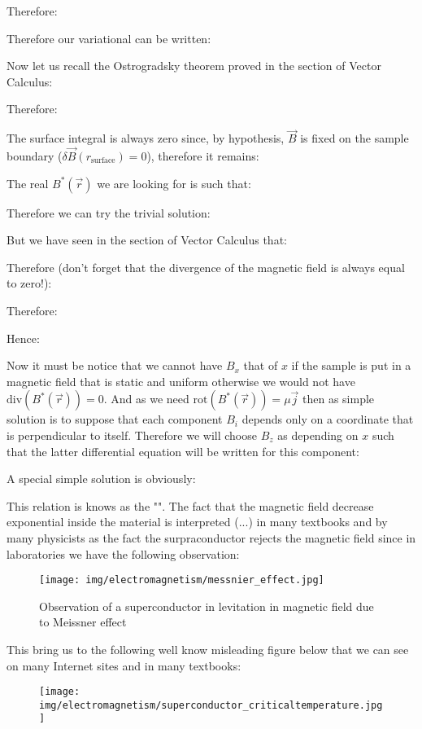 	Therefore:
	
	Therefore our variational can be written:
	
	Now let us recall the Ostrogradsky theorem proved in the section of Vector Calculus:
	
	Therefore:
	
	The surface integral is always zero since, by hypothesis, $\vec{B}$ is fixed on the sample boundary ($\delta\vec{B}(r_\text{surface})=0$), therefore it remains:
	
	The real $B^{*}(\vec{r})$ we are looking for is such that:
	
	Therefore we can try the trivial solution:
	
	But we have seen in the section of Vector Calculus that:
	
	Therefore (don't forget that the divergence of the magnetic field is always equal to zero!):
	
	Therefore:
	
	Hence:
	
	Now it must be notice that we cannot have $B_x$ that of $x$ if the sample is put in a magnetic field that is static and uniform otherwise we would not have $\text{div}(B^{*}(\vec{r}))=0$. And as we need $\text{rot}(B^{*}(\vec{r}))=\mu\vec{j}$ then as simple solution is to suppose that each component $B_i$ depends only on a coordinate that is perpendicular to itself. Therefore we will choose $B_z$ as depending on $x$ such that the latter differential equation will be written for this component:
	
	A special simple solution is obviously:
	
	This relation is knows as the "". The fact that the magnetic field decrease exponential inside the material is interpreted (...) in many textbooks and by many physicists as the fact the surpraconductor rejects the magnetic field since in laboratories we have the following observation:
	\begin{figure}[H]
		\centering
		\texttt{[image: img/electromagnetism/messnier\_effect.jpg]}
		\caption{Observation of a superconductor in levitation in magnetic field due to Meissner effect}
	\end{figure}
	This bring us to the following well know misleading figure below that we can see on many Internet sites and in many textbooks:
	\begin{figure}[H]
		\centering
		\texttt{[image: img/electromagnetism/superconductor\_criticaltemperature.jpg]}
	\end{figure}
	
